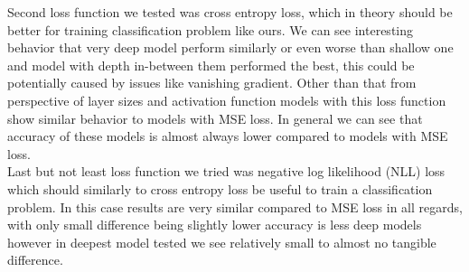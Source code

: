Second loss function we tested was cross entropy loss, which in theory should be better for training classification problem like ours. We can see interesting behavior that very deep model perform similarly or even worse than shallow one and model with depth in-between them performed the best, this could be potentially caused by issues like vanishing gradient. Other than that from perspective of layer sizes and activation function models with this loss function show similar behavior to models with MSE loss. In general we can see that accuracy of these models is almost always lower compared to models with MSE loss.
\\

Last but not least loss function we tried was negative log likelihood (NLL) loss which should similarly to cross entropy loss be useful to train a classification problem. In this case results are very similar compared to MSE loss in all regards, with only small difference being slightly lower accuracy is less deep models however in deepest model tested we see relatively small to almost no tangible difference.
\\  

